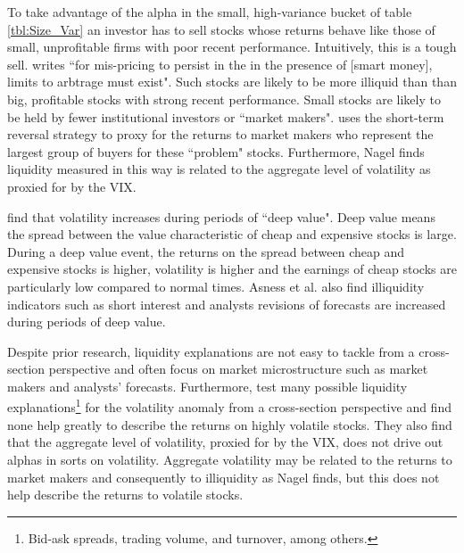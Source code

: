 To take advantage of the alpha in the small, high-variance bucket of table
\ref{tbl:Size_Var} an investor has to sell stocks whose returns behave
like those of small, unprofitable firms with poor recent performance.
Intuitively, this is a tough sell.
\textcite{nagel2005short} writes ``for mis-pricing to persist in the in the
presence of [smart money], limits to arbtrage must exist".
Such stocks are likely to be more illiquid than than big, profitable stocks
with strong recent performance.
Small stocks are likely to be held by fewer institutional investors or
``market makers".
\textcite{nagel2012evaporating} uses the short-term reversal strategy to proxy
for the returns to market makers who represent the largest group of buyers for
these ``problem" stocks.
Furthermore, Nagel finds liquidity measured in this way is related to the
aggregate level of volatility as proxied for by the VIX.

\textcite{asness2018deep} find that volatility increases during periods of
``deep value".
Deep value means the spread between the value characteristic of cheap and
expensive stocks is large.
During a deep value event, the returns on the spread between cheap and
expensive stocks is higher, volatility is higher and the earnings of cheap
stocks are particularly low compared to normal times.
Asness et al. also find illiquidity indicators such as short
interest and analysts revisions of forecasts are increased during periods of
deep value.

Despite prior research,
liquidity explanations are not easy to tackle from a cross-section
perspective and often focus on market microstructure such as market makers and
analysts' forecasts.
Furthermore, \textcite{ang2006cross} test many possible liquidity
explanations\footnote{Bid-ask spreads, trading volume, and
turnover, among others.} for the volatility anomaly from a cross-section perspective
and find none help greatly to describe the returns on highly volatile stocks.
They also find that the aggregate level of volatility, proxied for by the VIX,
does not drive out alphas in sorts on volatility.
Aggregate volatility may be related to the returns to market makers and
consequently to illiquidity as Nagel finds,
but this does not help describe the returns to
volatile stocks.


